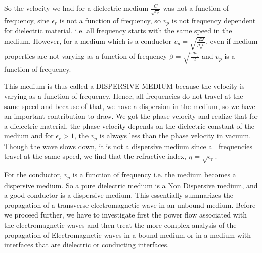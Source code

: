So the velocity we had for a dielectric medium $\frac{C}{\sqrt{\epsilon_{r}}}$ was not a function of frequency, sine $\epsilon_{r}$ is not a function of frequency, so $v_p$ is not frequency dependent for dielectric material. i.e. all frequency starts with the same speed in the medium.
However, for a medium which is a conductor $v_p=\sqrt{\frac{2\omega}{\mu_{o}\sigma}}$, even if medium properties are not varying as a function of frequency $\beta=\sqrt{\frac{\omega\mu_{o}}{2}}$ and $v_p$ is a function of frequency.

This medium is thus called a DISPERSIVE MEDIUM because the velocity is varying as a function of frequency. Hence, all frequencies do not travel at the same speed and because of that, we have a dispersion in the medium, so we have an important contribution to draw.
We got the phase velocity and realize that for a dielectric material, the phase velocity depends on the dielectric constant of the medium and for $\epsilon_{r} > 1$, the $v_p$ is always less than the phase velocity in vacuum. Though the wave slows down, it is not a dispersive medium since all frequencies travel at the same speed, we find that the refractive index, $\eta$ = $\sqrt{\epsilon_{r}}$.

For the conductor, $v_p$ is a function of frequency i.e. the medium becomes a dispersive medium. So a pure dielectric medium is a Non Dispersive medium, and a good conductor is a dispersive medium. This essentially summarizes the propagation of a transverse electromagnetic wave in an unbound medium. Before we proceed further, we have to investigate first the power flow associated with the electromagnetic waves and then treat the more complex analysis of the propagation of Electromagnetic waves in a bound medium or in a medium with interfaces that are dielectric or conducting interfaces.
